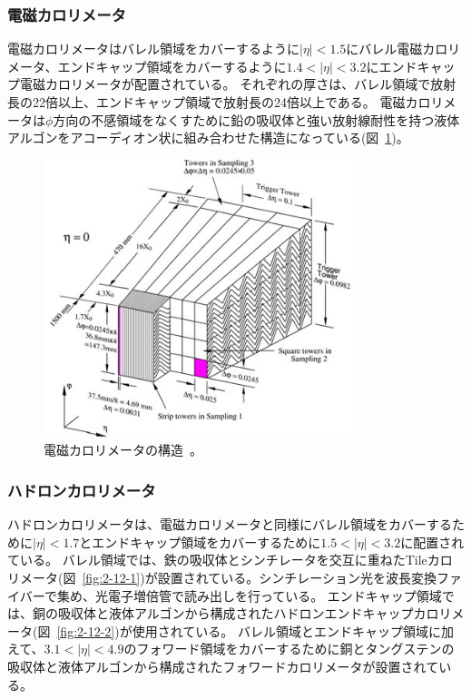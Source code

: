 \subsubsection{電磁カロリメータ}
電磁カロリメータはバレル領域をカバーするように$|\eta|<1.5$にバレル電磁カロリメータ、エンドキャップ領域をカバーするように$1.4<|\eta|<3.2$にエンドキャップ電磁カロリメータが配置されている。
それぞれの厚さは、バレル領域で放射長の22倍以上、エンドキャップ領域で放射長の24倍以上である。
電磁カロリメータは$\phi$方向の不感領域をなくすために鉛の吸収体と強い放射線耐性を持つ液体アルゴンをアコーディオン状に組み合わせた構造になっている(図~\ref{fig:2-11})。


\begin{figure}[h]
  \centering
  \includegraphics[clip, width=9cm]{fig/2/electoricCal.jpg}
  \caption{電磁カロリメータの構造~\cite{Aad:1129811}。}
  \label{fig:2-11}
\end{figure}

\subsubsection{ハドロンカロリメータ}
ハドロンカロリメータは、電磁カロリメータと同様にバレル領域をカバーするために$|\eta|<1.7$とエンドキャップ領域をカバーするために$1.5<|\eta|<3.2$に配置されている。
バレル領域では、鉄の吸収体とシンチレータを交互に重ねたTileカロリメータ(図~\ref{fig:2-12-1})が設置されている。シンチレーション光を波長変換ファイバーで集め、光電子増倍管で読み出しを行っている。
エンドキャップ領域では、銅の吸収体と液体アルゴンから構成されたハドロンエンドキャップカロリメータ(図~\ref{fig:2-12-2})が使用されている。
バレル領域とエンドキャップ領域に加えて、$3.1<|\eta|<4.9$のフォワード領域をカバーするために銅とタングステンの吸収体と液体アルゴンから構成されたフォワードカロリメータが設置されている。

